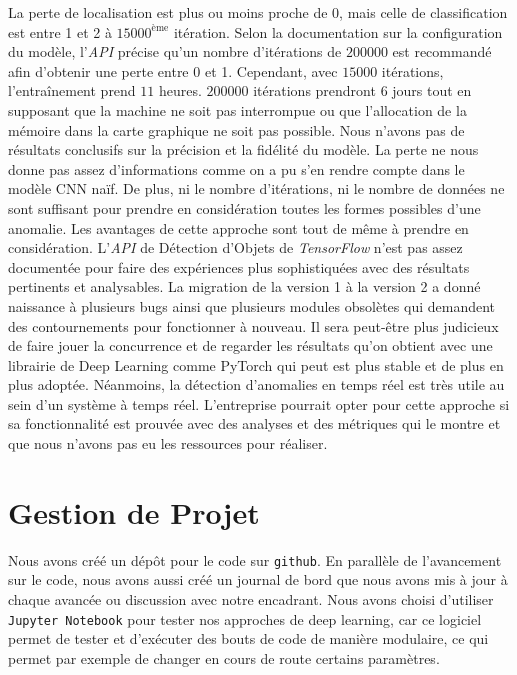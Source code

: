 \documentclass[french]{article}
\theoremstyle{mytheoremstyle}
\theoremstyle{mytheoremstyle}
\theoremstyle{myproblemstyle}
\begin{document}
    
    La perte de localisation est plus ou moins proche de 0, mais celle de classification est entre 1 et 2 à $15000^{\text{ème}}$ itération. Selon la documentation sur la configuration du modèle, l'\emph{API} précise qu'un nombre d'itérations de $200000$ est recommandé afin d'obtenir une perte entre 0 et 1. Cependant, avec $15000$ itérations, l'entraînement prend $11$ heures. $200000$ itérations prendront $6$ jours tout en supposant que la machine ne soit pas interrompue ou que l'allocation de la mémoire dans la carte graphique ne soit pas possible.
    \newline
    \newline
    \indent Nous n'avons pas de résultats conclusifs sur la précision et la fidélité du modèle. La perte ne nous donne pas assez d'informations comme on a pu s'en rendre compte dans le modèle CNN naïf. De plus, ni le nombre d'itérations, ni le nombre de données ne sont suffisant pour prendre en considération toutes les formes possibles d'une anomalie. Les avantages de cette approche sont tout de même à prendre en considération. L'\emph{API} de Détection d'Objets de \textit{TensorFlow} n'est pas assez documentée pour faire des expériences plus sophistiquées avec des résultats pertinents et analysables. La migration de la version 1 à la version 2 a donné naissance à plusieurs bugs ainsi que plusieurs modules obsolètes qui demandent des contournements pour fonctionner à nouveau. Il sera peut-être plus judicieux de faire jouer la concurrence et de regarder les résultats qu'on obtient avec une librairie de Deep Learning comme PyTorch qui peut est plus stable et de plus en plus adoptée.
    \newline
    \indent Néanmoins, la détection d'anomalies en temps réel est très utile au sein d'un système à temps réel. L'entreprise pourrait opter pour cette approche si sa fonctionnalité est prouvée avec des analyses et des métriques qui le montre et que nous n'avons pas eu les ressources pour réaliser.
    
    \section{Gestion de Projet}
    
    Nous avons créé un dépôt pour le code sur \texttt{github}\cite{githubproject}. En parallèle de l'avancement sur le code, nous avons aussi créé un journal de bord que nous avons mis à jour à chaque avancée ou discussion avec notre encadrant. Nous avons choisi d'utiliser \texttt{Jupyter Notebook} pour tester nos approches de deep learning, car ce logiciel permet de tester et d'exécuter des bouts de code de manière modulaire, ce qui permet par exemple de changer en cours de route certains paramètres.
    
\end{document}
